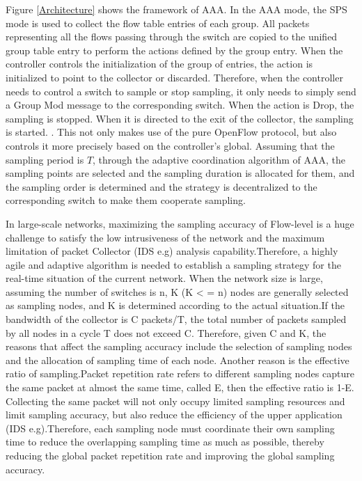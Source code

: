 \documentclass[conference,compsoc]{IEEEtran}
\begin{document}
Figure \ref{Architecture} shows the framework of AAA. In the AAA mode, the SPS mode is used to collect the flow table entries of each group. All packets representing all the flows passing through the switch are copied to the unified group table entry to perform the actions defined by the group entry. When the controller controls the initialization of the group of entries, the action is initialized to point to the collector or discarded. Therefore, when the controller needs to control a switch to sample or stop sampling, it only needs to simply send a Group Mod message to the corresponding switch. When the action is Drop, the sampling is stopped. When it is directed to the exit of the collector, the sampling is started. . This not only makes use of the pure OpenFlow protocol, but also controls it more precisely based on the controller's global. Assuming that the sampling period is $T$, through the adaptive coordination algorithm of AAA, the sampling points are selected and the sampling duration is allocated for them, and the sampling order is determined and the strategy is decentralized to the corresponding switch to make them cooperate sampling.

In large-scale networks, maximizing the sampling accuracy of Flow-level is a huge challenge to satisfy the low intrusiveness of the network and the maximum limitation of packet Collector (IDS e.g) analysis capability.Therefore, a highly agile and adaptive algorithm is needed to establish a sampling strategy for the real-time situation of the current network. When the network size is large, assuming the number of switches is n, K (K < = n) nodes are generally selected as sampling nodes, and K is determined according to the actual situation.If the bandwidth of the collector is C packets/T, the total number of packets sampled by all nodes in a cycle T does not exceed C. Therefore, given C and K, the reasons that affect the sampling accuracy include the selection of sampling nodes and the allocation of sampling time of each node. Another reason is the effective ratio of sampling.Packet repetition rate refers to different sampling nodes capture the same packet at almost the same time, called E, then the effective ratio is 1-E. Collecting the same packet will not only occupy limited sampling resources and limit sampling accuracy, but also reduce the efficiency of the upper application (IDS e.g).Therefore, each sampling node must coordinate their own sampling time to reduce the overlapping sampling time as much as possible, thereby reducing the global packet repetition rate and improving the global sampling accuracy.
\end{document}
